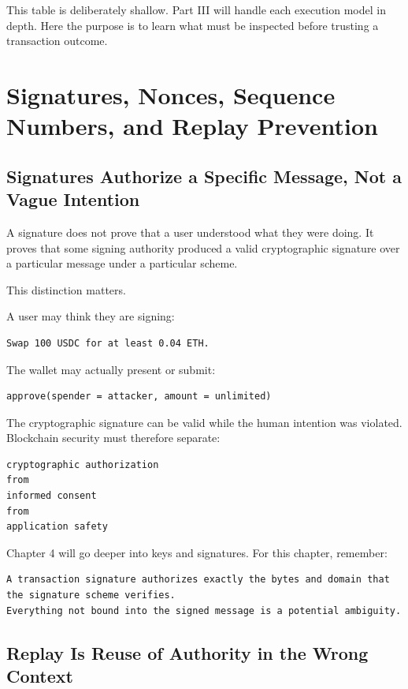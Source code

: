 This table is deliberately shallow. Part III will handle each execution
model in depth. Here the purpose is to learn what must be inspected
before trusting a transaction outcome.

\section{Signatures, Nonces, Sequence Numbers, and Replay Prevention}

\subsection{Signatures Authorize a Specific Message, Not a Vague
Intention}

A signature does not prove that a user understood what they were doing.
It proves that some signing authority produced a valid cryptographic
signature over a particular message under a particular scheme.

This distinction matters.

A user may think they are signing:

\begin{lstlisting}
Swap 100 USDC for at least 0.04 ETH.
\end{lstlisting}

The wallet may actually present or submit:

\begin{lstlisting}
approve(spender = attacker, amount = unlimited)
\end{lstlisting}

The cryptographic signature can be valid while the human intention was
violated. Blockchain security must therefore separate:

\begin{lstlisting}
cryptographic authorization
from
informed consent
from
application safety
\end{lstlisting}

Chapter 4 will go deeper into keys and signatures. For this chapter,
remember:

\begin{lstlisting}
A transaction signature authorizes exactly the bytes and domain that the signature scheme verifies.
Everything not bound into the signed message is a potential ambiguity.
\end{lstlisting}

\subsection{Replay Is Reuse of Authority in the Wrong Context}

